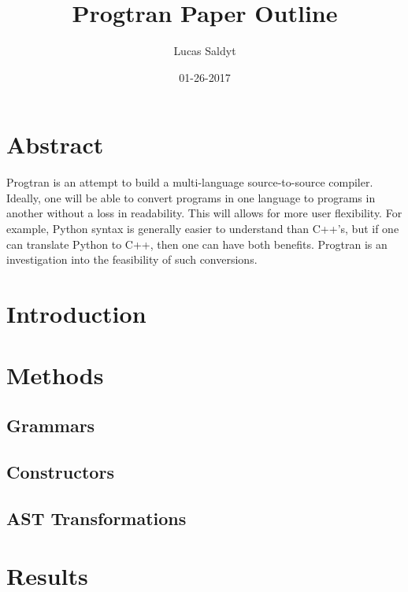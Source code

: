 \documentclass{article}
\title{Progtran Paper Outline}
\date{01-26-2017}
\author{Lucas Saldyt}
\begin{document}
\maketitle
{}
\newpage
{}

\section{Abstract}
Progtran is an attempt to build a multi-language source-to-source compiler. Ideally, one will be able to convert programs in one language to programs in another without a loss in readability. This will allows for more user flexibility. For example, Python syntax is generally easier to understand than C++'s, but if one can translate Python to C++, then one can have both benefits. Progtran is an investigation into the feasibility of such conversions.
\section{Introduction}
\section{Methods}
\subsection{Grammars}
\subsection{Constructors}
\subsection{AST Transformations}


\section{Results}
\end{document}
